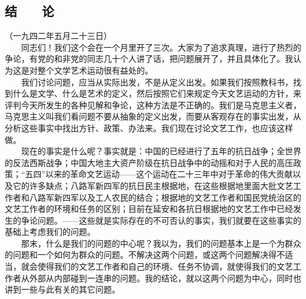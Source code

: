 \documentclass[cn,11pt,chinese]{elegantbook}
\def\myformat#1{\hfil\hfil #1}
\begin{document}
\subsection*{\myformat{结　　论}}
（一九四二年五月二十三日）\\
　　同志们！我们这个会在一个月里开了三次。大家为了追求真理，进行了热烈的争论，有党的和非党的同志几十个人讲了话，把问题展开了，并且具体化了。我认为这是对整个文学艺术运动很有益处的。\\
　　我们讨论问题，应当从实际出发，不是从定义出发。如果我们按照教科书，找到什么是文学、什么是艺术的定义，然后按照它们来规定今天文艺运动的方针，来评判今天所发生的各种见解和争论，这种方法是不正确的。我们是马克思主义者，马克思主义叫我们看问题不要从抽象的定义出发，而要从客观存在的事实出发，从分析这些事实中找出方针、政策、办法来。我们现在讨论文艺工作，也应该这样做。\\
　　现在的事实是什么呢？事实就是：中国的已经进行了五年的抗日战争；全世界的反法西斯战争；中国大地主大资产阶级在抗日战争中的动摇和对于人民的高压政策；“五四”以来的革命文艺运动——这个运动在二十三年中对于革命的伟大贡献以及它的许多缺点；八路军新四军的抗日民主根据地，在这些根据地里面大批文艺工作者和八路军新四军以及工人农民的结合；根据地的文艺工作者和国民党统治区的文艺工作者的环境和任务的区别；目前在延安和各抗日根据地的文艺工作中已经发生的争论问题。——这些就是实际存在的不可否认的事实，我们就要在这些事实的基础上考虑我们的问题。\\
　　那末，什么是我们的问题的中心呢？我以为，我们的问题基本上是一个为群众的问题和一个如何为群众的问题。不解决这两个问题，或这两个问题解决得不适当，就会使得我们的文艺工作者和自己的环境、任务不协调，就使得我们的文艺工作者从外部从内部碰到一连串的问题。我的结论，就以这两个问题为中心，同时也讲到一些与此有关的其它问题。\\
\end{document}
